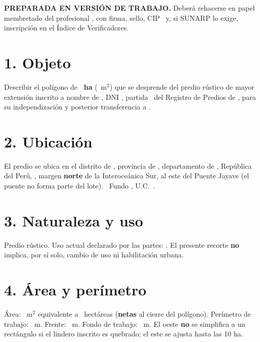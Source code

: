 \documentclass[12pt,a4paper]{article}
\begin{document}


\noindent \textbf{PREPARADA EN VERSIÓN DE TRABAJO.} Deberá rehacerse en papel membretado del profesional \IngenieroNombre, con firma, sello, CIP \IngenieroCIP\ y, si SUNARP lo exige, inscripción en el Índice de Verificadores.

\section*{1. Objeto}
Describir el polígono de \textbf{\AreaIndependizarHa\ ha} (\AreaIndependizarMetros\ m$^2$) que se desprende del predio rústico de mayor extensión inscrito a nombre de \VendedorNombreCompleto, DNI \VendedorDNI, partida \PartidaMatriz\ del Registro de Predios de \OficinaRegistral, para su independización y posterior transferencia a \CompradorNombreCompleto.

\section*{2. Ubicación}
El predio se ubica en el distrito de \Distrito, provincia de \Provincia, departamento de \Departamento, República del Perú, \UbicacionRegistral, margen \textbf{norte} de la Interoceánica Sur, al este del Puente Jayave (el puente no forma parte del lote). \CriterioRecorte\ Fundo \NombreFundo, U.C.\ \UnidadCatastral.

\section*{3. Naturaleza y uso}
Predio rústico. Uso actual declarado por las partes: . El presente recorte \textbf{no} implica, por sí solo, cambio de uso ni habilitación urbana.

\section*{4. Área y perímetro}
Área: \AreaIndependizarMetros\ m$^2$ equivalente a \AreaIndependizarHa\ hectáreas (\textbf{netas} al cierre del polígono). Perímetro de trabajo: \PerimetroM\ m. Frente: \FrenteM\ m. Fondo de trabajo: \FondoM\ m. El oeste \textbf{no} se simplifica a un rectángulo si el lindero inscrito es quebrado; el este se ajusta hasta las 10 ha.
\end{document}
